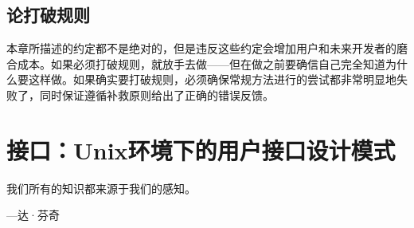 \documentclass[12pt,oneside]{book}
\begin{document}
\begin{common-format}
\section{论打破规则}
本章所描述的约定都不是绝对的，但是违反这些约定会增加用户和未来开发者的磨合成本。如果必须打破规则，就放手去做——但在做之前要确信自己完全知道为什么要这样做。如果确实要打破规则，必须确保常规方法进行的尝试都非常明显地失败了，同时保证遵循补救原则给出了正确的错误反馈。




\chapter{接口：Unix环境下的用户接口设计模式}
\begin{flushright}
\begin{notecard}{20em}
我们所有的知识都来源于我们的感知。

{\hfill —达·芬奇}
\end{notecard}
\end{flushright}









\end{common-format}  
\end{document}

